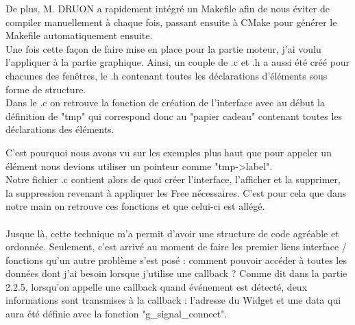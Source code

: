 \documentclass[11pt,french,a4paper]{report}
\begin{document}
De plus, M. DRUON a rapidement intégré un Makefile afin de nous éviter de compiler manuellement à chaque fois, passant 
ensuite à CMake pour générer le Makefile automatiquement ensuite. \\


Une fois cette façon de faire mise en place pour la partie moteur, j'ai voulu l'appliquer à la partie
graphique. Ainsi, un couple de .c et .h a aussi été créé pour chacunes des fenêtres, le .h contenant 
toutes les déclarations d'éléments sous forme de structure. \\

Dans le .c on retrouve la fonction de création de l'interface avec au début la définition de "tmp" qui correspond donc 
au "papier cadeau" contenant toutes les déclarations des éléments. 

C'est pourquoi nous avons vu sur les exemples plus haut 
que pour appeler un élément nous devions utiliser un pointeur comme "tmp->label". \\

Notre fichier .c contient alors de quoi créer l'interface, l'afficher et la supprimer, la suppression revenant à appliquer les 
Free  nécessaires. C'est pour cela que dans notre main on retrouve ces fonctions et que celui-ci est allégé. \\
\\

Jusque là, cette technique m'a permit d'avoir une structure de code agréable et ordonnée. Seulement, c'est arrivé au moment de 
faire les premier liens interface / fonctions qu'un autre problème s'est posé : comment pouvoir accéder à toutes les données
dont j'ai besoin lorsque j'utilise une callback ? 
Comme dit dans la partie 2.2.5, lorsqu'on appelle une callback quand événement est détecté, deux informations sont 
transmises à la callback : l'adresse du Widget et une data qui aura été définie avec la fonction "g\_signal\_connect". \\
\end{document}
